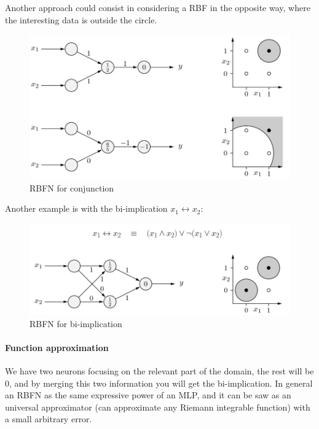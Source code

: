\documentclass{article}
\begin{document}
Another approach could consist in considering a RBF in the opposite way, where the interesting
data is outside the circle.
\begin{figure}[H]
    \centering
    \includegraphics[scale=0.5]{images/RBFN.png}
    \caption{RBFN for conjunction}
\end{figure}
Another example is with the bi-implication $x_1\longleftrightarrow x_2$:
\begin{figure}[H]
    \centering
    \includegraphics[scale=0.4]{images/RBFN_bi.png}
    \caption{RBFN for bi-implication}
\end{figure}

\paragraph{Function approximation}
We have two neurons focusing on the relevant part of the domain, the rest will be $0$, and by merging
this two information you will get the bi-implication. In general an RBFN as the same expressive
power of an MLP, and it can be saw as an universal approximator (can approximate any Riemann integrable
function) with a small arbitrary error.
\end{document}
